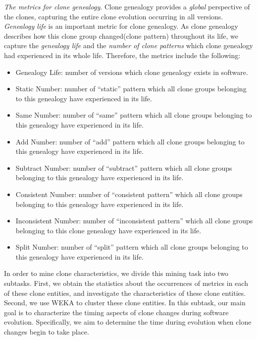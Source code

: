 {\em The metrics for clone genealogy}. Clone genealogy provides a {\em global} perspective of the clones, capturing the entire clone evolution occurring in all versions. %
{\em Genealogy life} is an important metric for clone genealogy.
As clone genealogy describes how this clone group changed(clone pattern) throughout its life,  %
we capture the {\em genealogy life} and the {\em number of clone patterns} which clone genealogy had experienced in its whole life. Therefore, the metrics include the following:
\begin{itemize}
\setlength{\itemsep}{0pt}
\setlength{\parsep}{0pt}
\setlength{\parskip}{0pt}
\item Genealogy  Life: number of versions which clone genealogy exists in software.
\item Static Number: number of ``static'' pattern which all clone groups belonging to this genealogy have experienced in its life.
\item Same Number: number of ``same'' pattern which all clone groups belonging to this genealogy have experienced in its life.
\item Add Number: number of ``add'' pattern which all clone groups belonging to this genealogy have experienced  in its life.
\item Subtract Number: number of ``subtract'' pattern which all clone groups belonging to this genealogy have experienced in its life.
\item Consistent Number: number of ``consistent pattern'' which all clone groups belonging to this genealogy have experienced in its life.
\item Inconsistent Number: number of ``inconsistent pattern'' which all clone groups belonging to this clone genealogy have experienced in its life.
\item Split Number: number of ``split'' pattern which all clone groups belonging to this genealogy have experienced in its life.
\end{itemize}


In order to mine clone characteristics, %
we divide this mining task into two subtasks. First, we obtain the statistics about the occurrences of metrics in each of these clone entities, and investigate the characteristics of these clone entities. Second, we use WEKA to cluster these clone entities. In this subtask, our main goal is to characterize the timing aspects of clone changes during software evolution. Specifically, we aim to determine the time during evolution when clone changes begin to take place. %

